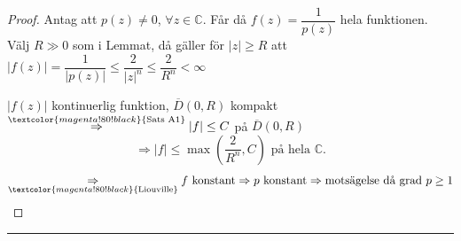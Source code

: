 \begin{proof}
Antag att $p(z) \neq 0$, $\forall z \in \mathbb{C}$. Får då $f(z) = \dfrac{1}{p(z)}$ hela funktionen. Välj $R \gg 0$ som i Lemmat, då gäller för $|z| \ge R$ att $|f(z)| = \dfrac{1}{|p(z)|} \le \dfrac{2}{|z|^n} \le \dfrac{2}{R^n} < \infty$

$|f(z)|$ kontinuerlig funktion, $\overline{D}(0, R)$ kompakt $\overset{\textcolor{magenta!80!black}{\text{Sats A1}}}{\Rightarrow} |f| \le C$ på $\overline{D}(0, R)$
\[ \Rightarrow |f| \le \max\left( \frac{2}{R^n}, C \right) \text{ på hela } \mathbb{C}. \]
\[ \underset{\textcolor{magenta!80!black}{\text{Liouville}}}{\Rightarrow} f \text{ konstant} \Rightarrow p \text{ konstant} \Rightarrow \text{motsägelse då grad } p \ge 1 \]
\end{proof}

\noindent\rule{\linewidth}{0.4pt}

